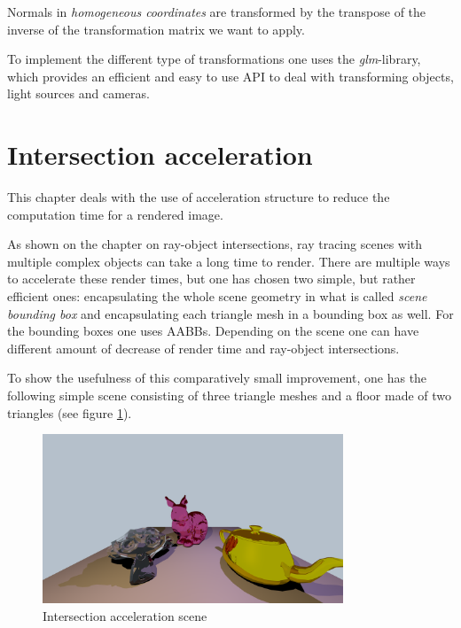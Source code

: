 \documentclass{article}
\begin{document}
\vspace*{\baselineskip}

Normals in \textit{homogeneous coordinates} are transformed by the transpose of the inverse of the transformation matrix we want to apply. 

\vspace*{\baselineskip}

To implement the different type of transformations one uses the \textit{glm}-library, which provides an efficient and easy to use API to deal with transforming objects, light sources and cameras.


\section{Intersection acceleration}
\label{sec:accel}
This chapter deals with the use of acceleration structure to reduce the computation time for a rendered image.

\vspace*{\baselineskip}

As shown on the chapter on ray-object intersections, ray tracing scenes with multiple complex objects can take a long time to render. There are multiple ways to accelerate these render times, but one has chosen two simple, but rather efficient ones: encapsulating the whole scene geometry in what is called \textit{scene bounding box} and encapsulating each triangle mesh in a bounding box as well. For the bounding boxes one uses AABBs. Depending on the scene one can have different amount of decrease of render time and ray-object intersections. 

\vspace*{\baselineskip}

To show the usefulness of this comparatively small improvement, one has the following simple scene consisting of three triangle meshes and a floor made of two triangles (see figure \ref{fig:intersection_acceleration_scene}).

\begin{figure}[h!]
	\centering
	\includegraphics[width=0.8\textwidth]{intersection_acceleration_scene}
	\caption{Intersection acceleration scene}
	\label{fig:intersection_acceleration_scene}
\end{figure}
\end{document}
